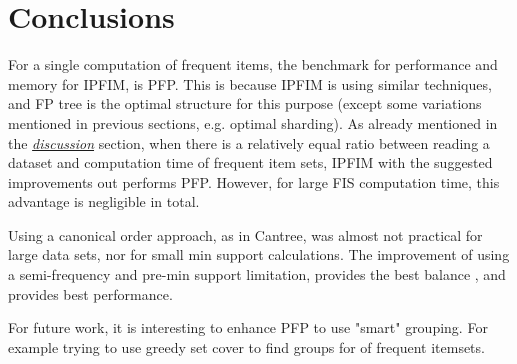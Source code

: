 \section{Conclusions}
For a single computation of frequent items, the benchmark for performance and memory for IPFIM, is PFP. This is because IPFIM is using similar techniques, and FP tree is the optimal structure for this purpose (except some variations mentioned in previous sections, e.g. optimal sharding).
As already mentioned in the \hyperref[sec:discussion]{\textit{discussion}} section, when there is a relatively equal ratio between reading a dataset and computation time of frequent item sets, IPFIM with the suggested improvements out performs PFP. However, for large FIS computation time, this advantage is negligible in total.

Using a canonical order approach, as in Cantree, was almost not practical for large data sets, nor for small min support calculations. The improvement of using a semi-frequency and pre-min support limitation, provides the best balance , and provides best performance.

For future work, it is interesting to enhance PFP to use "smart" grouping. For example trying to use greedy set cover to find groups for of frequent itemsets.
